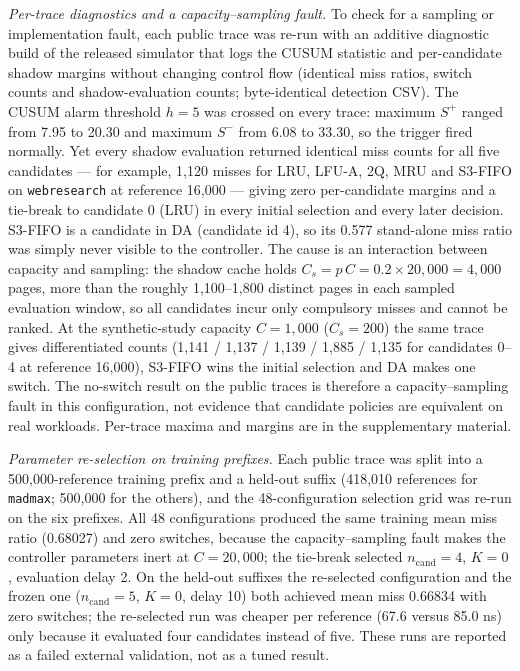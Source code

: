 \documentclass[10pt,twocolumn,a4paper]{IEEEtran}
\begin{document}
\emph{Per-trace diagnostics and a capacity--sampling fault.} To check for a
sampling or implementation fault, each public trace was re-run with an
additive diagnostic build of the released simulator that logs the CUSUM
statistic and per-candidate shadow margins without changing control flow
(identical miss ratios, switch counts and shadow-evaluation counts; byte-identical
detection CSV). The CUSUM alarm threshold $h = 5$ was crossed on every trace:
maximum $S^+$ ranged from 7.95 to 20.30 and maximum $S^-$ from 6.08 to 33.30,
so the trigger fired normally. Yet every shadow evaluation returned identical
miss counts for all five candidates --- for example, 1,120 misses for LRU,
LFU-A, 2Q, MRU and S3-FIFO on \texttt{webresearch} at reference 16,000 --- giving
zero per-candidate margins and a tie-break to candidate 0 (LRU) in every
initial selection and every later decision. S3-FIFO is a candidate in DA
(candidate id 4), so its 0.577 stand-alone miss ratio was simply never visible
to the controller. The cause is an interaction between capacity and sampling:
the shadow cache holds $C_s = p\,C = 0.2 \times 20{,}000 = 4{,}000$ pages, more
than the roughly 1,100--1,800 distinct pages in each sampled evaluation window,
so all candidates incur only compulsory misses and cannot be ranked. At the
synthetic-study capacity $C = 1{,}000$ ($C_s = 200$) the same trace gives
differentiated counts (1,141 / 1,137 / 1,139 / 1,885 / 1,135 for candidates
0--4 at reference 16,000), S3-FIFO wins the initial selection and DA makes one
switch. The no-switch result on the public traces is therefore a
capacity--sampling fault in this configuration, not evidence that candidate
policies are equivalent on real workloads. Per-trace maxima and margins are in
the supplementary material.

\emph{Parameter re-selection on training prefixes.} Each public trace was split
into a 500,000-reference training prefix and a held-out suffix (418,010
references for \texttt{madmax}; 500,000 for the others), and the 48-configuration
selection grid was re-run on the six prefixes. All 48 configurations produced
the same training mean miss ratio (0.68027) and zero switches, because the
capacity--sampling fault makes the controller parameters inert at $C = 20{,}000$;
the tie-break selected $n_{\mathrm{cand}} = 4$, $K = 0$, evaluation delay 2. On
the held-out suffixes the re-selected configuration and the frozen one
($n_{\mathrm{cand}} = 5$, $K = 0$, delay 10) both achieved mean miss 0.66834 with
zero switches; the re-selected run was cheaper per reference (67.6 versus 85.0
ns) only because it evaluated four candidates instead of five. These runs are
reported as a failed external validation, not as a tuned result.
\end{document}
